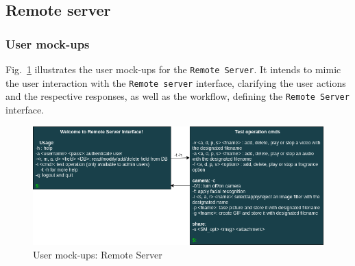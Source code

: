 %
\subsection{Remote server}
\label{sec:remote-serv-decomp}

\subsubsection{User mock-ups}
\label{sec:user-mockups-2}
Fig.~\ref{fig:user-mockups-rs} illustrates the user mock-ups for the
\texttt{Remote Server}. It intends to mimic the user interaction with the
\texttt{Remote server} interface,
clarifying the user actions and the respective responses, as well as the
workflow, defining the \texttt{Remote Server} interface.
%
\begin{figure}[htb!]
\centering
    \includegraphics[width=1.0\columnwidth]{./img/user-mockups-rs.png}
  \caption{User mock-ups: Remote Server}%
\label{fig:user-mockups-rs}
\end{figure}

